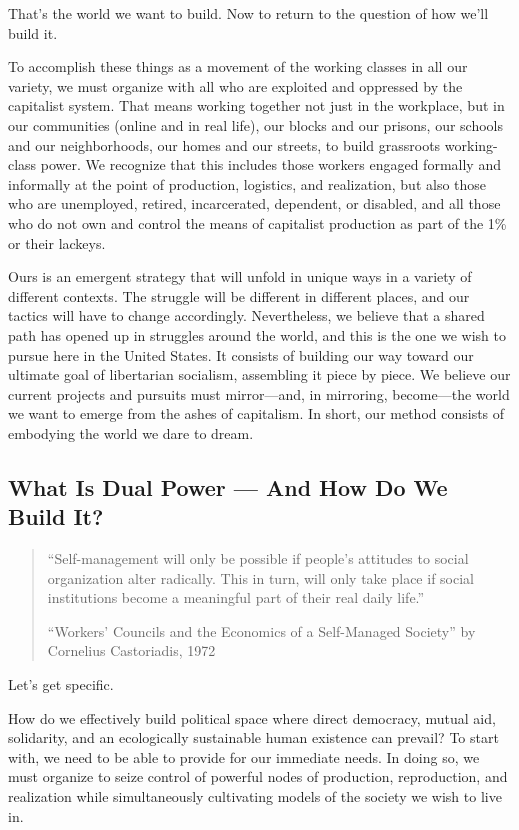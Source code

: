 \documentclass[10pt]{memoir}
\def \href #1#2{#2} %
\begin{document}
That's the world we want to build. Now to return to the question of how
we'll build it.

To accomplish these things as a movement of the working classes in all
our variety, we must organize with all who are exploited and oppressed
by the capitalist system. That means working together not just in the
workplace, but in our communities (online and in real life), our blocks
and our prisons, our schools and our neighborhoods, our homes and our
streets, to build grassroots working-class power. We recognize that this
includes those workers engaged formally and informally at the point of
production, logistics, and realization, but also those who are
unemployed, retired, incarcerated, dependent, or disabled, and all those
who do not own and control the means of capitalist production as part of
the 1\% or their lackeys.

Ours is an emergent strategy that will unfold in unique ways in a
variety of different contexts. The struggle will be different in
different places, and our tactics will have to change accordingly.
Nevertheless, we believe that a shared path has opened up in struggles
around the world, and this is the one we wish to pursue here in the
United States. It consists of building our way toward our ultimate goal
of libertarian socialism, assembling it piece by piece. We believe our
current projects and pursuits must mirror---and, in mirroring,
become---the world we want to emerge from the ashes of capitalism. In
short, our method consists of embodying the world we dare to dream.

\subsection{What Is Dual Power --- And How Do We Build
It?}\label{what-is-dual-power-and-how-do-we-build-it}

\begin{quote}
``Self-management will only be possible if people's attitudes to social
organization alter radically. This in turn, will only take place if
social institutions become a meaningful part of their real daily life.''

\href{https://www.marxists.org/archive/castoriadis/1972/workers-councils.htm}{``Workers'
Councils and the Economics of a Self-Managed Society''} by Cornelius
Castoriadis, 1972
\end{quote}

Let's get specific.

How do we effectively build political space where direct democracy,
mutual aid, solidarity, and an ecologically sustainable human existence
can prevail? To start with, we need to be able to provide for our
immediate needs. In doing so, we must organize to seize control of
powerful nodes of production, reproduction, and realization while
simultaneously cultivating models of the society we wish to live in.
\end{document}
